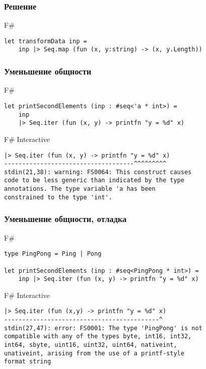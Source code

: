 \documentclass[xetex,mathserif,serif]{beamer}
\begin{document}
	\begin{frame}[fragile]
		\frametitle{Решение}
		\begin{exampleblock}{F\#}
			\begin{lstlisting}
let transformData inp =
    inp |> Seq.map (fun (x, y:string) -> (x, y.Length))
\end{lstlisting}
\end{exampleblock}
\end{frame}

	\begin{frame}[fragile]
		\frametitle{Уменьшение общности}
		\begin{exampleblock}{F\#}
			\begin{lstlisting}
let printSecondElements (inp : #seq<'a * int>) =
    inp
    |> Seq.iter (fun (x, y) -> printfn "y = %d" x)
\end{lstlisting}
\end{exampleblock}

\begin{alertblock}{F\# Interactive}
\begin{lstlisting}[keywordstyle=\color{black}]
|> Seq.iter (fun (x, y) -> printfn "y = %d" x)
------------------------------------^^^^^^^^^
stdin(21,38): warning: FS0064: This construct causes 
code to be less generic than indicated by the type 
annotations. The type variable 'a has been 
constrained to the type 'int'.
\end{lstlisting}
\end{alertblock}
\end{frame}

	\begin{frame}[fragile]
		\frametitle{Уменьшение общности, отладка}
		\begin{exampleblock}{F\#}
			\begin{lstlisting}
type PingPong = Ping | Pong

let printSecondElements (inp : #seq<PingPong * int>) =
    inp |> Seq.iter (fun (x, y) -> printfn "y = %d" x)
\end{lstlisting}
\end{exampleblock}

\begin{alertblock}{F\# Interactive}
\begin{lstlisting}[keywordstyle=\color{black}]
|> Seq.iter (fun (x,y) -> printfn "y = %d" x)
-------------------------------------------^
stdin(27,47): error: FS0001: The type 'PingPong' is not 
compatible with any of the types byte, int16, int32, 
int64, sbyte, uint16, uint32, uint64, nativeint, 
unativeint, arising from the use of a printf-style 
format string
\end{lstlisting}
\end{alertblock}
\end{frame}
\end{document}
